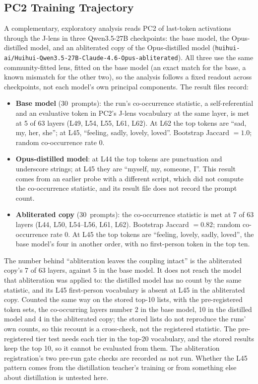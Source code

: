 \documentclass[11pt,a4paper]{article}
\begin{document}
\subsection{PC2 Training Trajectory}

A complementary, exploratory analysis reads PC2 of last-token
activations through the J-lens in three Qwen3.5-27B checkpoints: the
base model, the Opus-distilled model, and an abliterated copy of the
Opus-distilled model
(\nolinkurl{huihui-ai/Huihui-Qwen3.5-27B-Claude-4.6-Opus-abliterated}).
All three use the same community-fitted lens, fitted on the base model
(an exact match for the base, a known mismatch for the other two), so
the analysis follows a fixed readout across checkpoints, not each
model's own principal components. The result files record:

\begin{itemize}[nosep]
\item \textbf{Base model} (30~prompts): the run's co-occurrence
  statistic, a self-referential and an evaluative token in PC2's J-lens
  vocabulary at the same layer, is met at 5 of 63 layers (L49, L54, L55,
  L61, L62). At L62 the top tokens are ``sad, my, her, she''; at L45,
  ``feeling, sadly, lovely, loved''. Bootstrap Jaccard $= 1.0$; random
  co-occurrence rate $0$.
\item \textbf{Opus-distilled model}: at L44 the top tokens are
  punctuation and underscore strings; at L45 they are ``myself, my,
  someone, I''. This result comes from an earlier probe with a different
  script, which did not compute the co-occurrence statistic, and its
  result file does not record the prompt count.
\item \textbf{Abliterated copy} (30~prompts): the co-occurrence
  statistic is met at 7 of 63 layers (L44, L50, L54--L56, L61, L62).
  Bootstrap Jaccard $= 0.82$; random co-occurrence rate $0$. At L45 the
  top tokens are ``feeling, lovely, sadly, loved'', the base model's
  four in another order, with no first-person token in the top ten.
\end{itemize}

The number behind ``abliteration leaves the coupling intact'' is the
abliterated copy's 7 of 63 layers, against 5 in the base model. It
does not reach the model that abliteration was applied to: the
distilled model has no count by the same statistic, and its L45
first-person vocabulary is absent at L45 in the abliterated copy.
Counted the same way on the stored top-10 lists, with the
pre-registered token sets, the co-occurring layers number 2 in the base
model, 10 in the distilled model and 4 in the abliterated copy; the
stored lists do not reproduce the runs' own counts, so this recount is
a cross-check, not the registered statistic. The pre-registered tier
test needs each tier in the top-20 vocabulary, and the stored results
keep the top 10, so it cannot be evaluated from them. The abliteration
registration's two pre-run gate checks are recorded as not run.
Whether the L45 pattern comes from the distillation teacher's training
or from something else about distillation is untested here.
\end{document}
